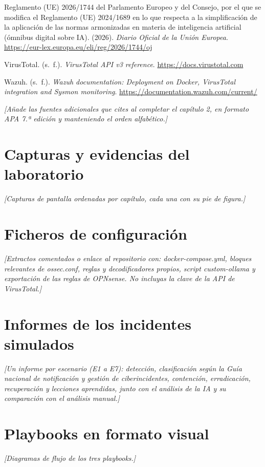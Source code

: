 \documentclass[11pt,a4paper,oneside]{report}
\newcommand{\guia}[1]{{\color{guia}\itshape[#1]}}
\begin{document}
\begin{list}{}{\leftmargin=1.27cm \itemindent=-1.27cm \itemsep=6pt}
  \item Reglamento (UE) 2026/1744 del Parlamento Europeo y del Consejo, por el que se modifica el Reglamento (UE) 2024/1689 en lo que respecta a la simplificación de la aplicación de las normas armonizadas en materia de inteligencia artificial (ómnibus digital sobre IA). (2026). \textit{Diario Oficial de la Unión Europea}. \url{https://eur-lex.europa.eu/eli/reg/2026/1744/oj}
  \item VirusTotal. (s.~f.). \textit{VirusTotal API v3 reference}. \url{https://docs.virustotal.com}
  \item Wazuh. (s.~f.). \textit{Wazuh documentation: Deployment on Docker, VirusTotal integration and Sysmon monitoring}. \url{https://documentation.wazuh.com/current/}
\end{list}

\guia{Añade las fuentes adicionales que cites al completar el capítulo 2, en formato APA 7.ª edición y manteniendo el orden alfabético.}

\appendix
\renewcommand{\appendixname}{Anexo}
\chapter{Capturas y evidencias del laboratorio}
\guia{Capturas de pantalla ordenadas por capítulo, cada una con su pie de figura.}

\chapter{Ficheros de configuración}
\guia{Extractos comentados o enlace al repositorio con: docker-compose.yml, bloques relevantes de ossec.conf, reglas y decodificadores propios, script custom-ollama y exportación de las reglas de OPNsense. No incluyas la clave de la API de VirusTotal.}

\chapter{Informes de los incidentes simulados}
\label{anx:informes}
\guia{Un informe por escenario (E1 a E7): detección, clasificación según la Guía nacional de notificación y gestión de ciberincidentes, contención, erradicación, recuperación y lecciones aprendidas, junto con el análisis de la IA y su comparación con el análisis manual.}

\chapter{Playbooks en formato visual}
\guia{Diagramas de flujo de los tres playbooks.}
\end{document}
